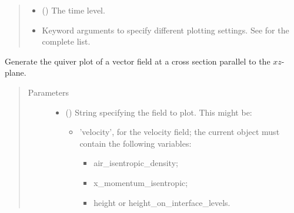 \documentclass[letterpaper,10pt,english]{sphinxmanual}
\begin{document}
\begin{fulllineitems}
\begin{fulllineitems}
\begin{quote}
\begin{description}
\begin{itemize}
\item {} 
 () \textendash{} The time level.

\item {} 
 \textendash{} Keyword arguments to specify different plotting settings.
See {\hyperref[\detokenize{api:tasmania.utils.utils_plot.quiver_xy}]{}} for the complete list.

\end{itemize}

\end{description}\end{quote}

\end{fulllineitems}


\begin{fulllineitems}
\label{\detokenize{api:storages.state_isentropic.StateIsentropic.quiver_xz}}
Generate the quiver plot of a vector field at a cross section parallel to the \(xz\)-plane.
\begin{quote}\begin{description}
\item[{Parameters}] \leavevmode\begin{itemize}
\item {} 
 () \textendash{} 
String specifying the field to plot. This might be:
\begin{itemize}
\item {} 
’velocity’, for the velocity field; the current object must contain the following variables:
\begin{itemize}
\item {} 
air\_isentropic\_density;

\item {} 
x\_momentum\_isentropic;

\item {} 
height or height\_on\_interface\_levels.

\end{itemize}

\end{itemize}



\end{itemize}
\end{description}
\end{quote}
\end{fulllineitems}
\end{fulllineitems}
\end{document}
